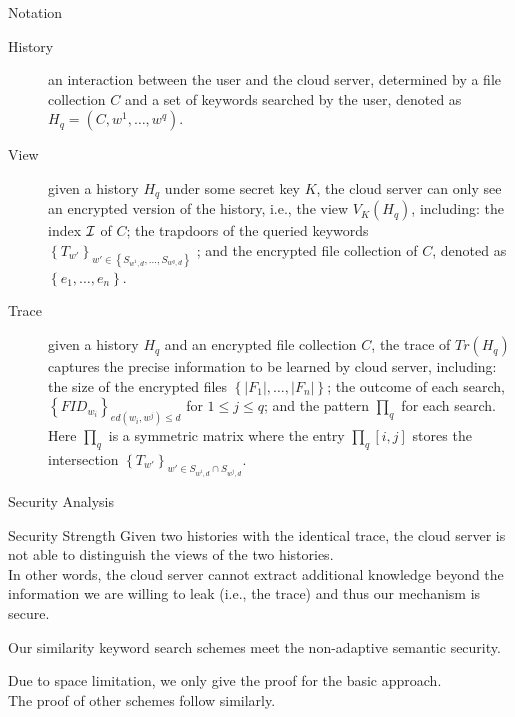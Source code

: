 \documentclass{beamer}
\begin{document}
\begin{frame}{Notation}
\begin{description}
	\item[History] an interaction between the user and the cloud
	server, determined by a file collection $C$ and a set of keywords
	searched by the user, denoted as ${H_q} = (C,{w^1}, \ldots ,{w^q})$.
	\item[View] given a history ${H_q}$ under some secret key $K$, the cloud
	server can only see an encrypted version of the history, i.e., the
	view ${V_K}({H_q})$, including: the index $\cal I$ of $C$; the trapdoors of the
	queried keywords ${\left\{ {{T_{w'}}} \right\}_{w' \in \left\{ {{S_{{w^1},d}}, \ldots ,{S_{{w^q},d}}} \right\}}}$ ; and the encrypted
	file collection of $C$, denoted as $\left\{ {{e_1}, \ldots ,{e_n}} \right\}$.
	\item[Trace] given a history ${H_q}$ and an encrypted file collection $C$, the trace of ${Tr({H_q})}$ captures the precise information to be learned by cloud server, including: the size of the encrypted files $\left\{ {\left| {{F_1}} \right|, \ldots ,\left| {{F_n}} \right|} \right\}$; the outcome of each search, ${\left\{ {FI{D_{{w_i}}}} \right\}_{ed({w_i},{w^j}) \le d}}$ for $1 \le j \le q$; and the pattern ${\prod_q}$ for each search. Here ${\prod_q}$ is a symmetric matrix where the entry ${\prod _q}[i,j]$ stores the intersection ${\left\{ {{T_{w'}}} \right\}_{w' \in {S_{{w^i},d}} \cap {S_{{w^j},d}}}}$.
\end{description}
\end{frame}

\begin{frame}{Security Analysis}
	\begin{exampleblock}{Security Strength}
		Given two histories with the identical trace, the cloud server is not able to distinguish the views of the two histories.\\
		In other words, the cloud server cannot extract additional knowledge beyond the information we are willing to leak (i.e., the trace) and thus our mechanism is secure.
	\end{exampleblock}
	\begin{theorem}
		Our similarity keyword search schemes meet the non-adaptive semantic security.
	\end{theorem}
	\begin{exampleblock}{}
		Due to space limitation, we only give the proof for the basic approach.\\
		The proof of other schemes follow similarly.
	\end{exampleblock}
	
\end{frame}
\end{document}
